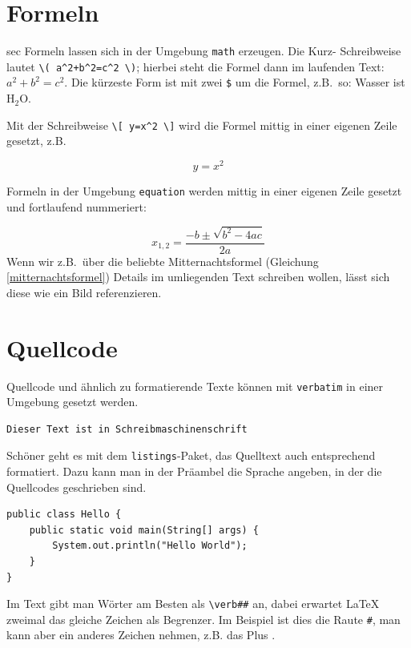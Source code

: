 \section{Formeln}
\label{ch:illustrationen:sec:formula}

sec Formeln lassen sich in der Umgebung  \verb|math| erzeugen.
Die Kurz- Schreibweise lautet \verb|\( a^2+b^2=c^2 \)|;  hierbei steht die Formel dann im laufenden Text: \( a^2+b^2=c^2 \).
Die kürzeste Form ist mit zwei \verb|$| um die Formel, z.B.~so: Wasser ist H$_2$O.

Mit der Schreibweise \verb|\[ y=x^2 \]| wird die Formel mittig in einer eigenen Zeile gesetzt, z.B.

\[y = x^2 \]

Formeln in der Umgebung \verb|equation| werden mittig in einer eigenen Zeile gesetzt und fortlaufend nummeriert:

\begin{equation}
x_{1,2} = \frac{-b\pm\sqrt{b^2-4ac}}{2a}
\label{mitternachtsformel}
\end{equation}
Wenn wir z.B.~über die beliebte Mitternachtsformel (Gleichung \ref{mitternachtsformel}) Details im umliegenden Text schreiben wollen, lässt sich diese wie ein Bild referenzieren.

\section{Quellcode}
\label{ch:illustrationen:sec:code}

Quellcode und ähnlich zu formatierende Texte können mit \verb|verbatim| in einer Umgebung gesetzt werden.

\begin{verbatim}
Dieser Text ist in Schreibmaschinenschrift
\end{verbatim}

Schöner geht es mit dem \verb|listings|-Paket, das Quelltext auch entsprechend formatiert.
Dazu kann man in der Präambel die Sprache angeben, in der die Quellcodes geschrieben sind.

\begin{lstlisting}
public class Hello {
    public static void main(String[] args) {
        System.out.println("Hello World");
    }
}
\end{lstlisting}

Im Text gibt man Wörter am Besten als \verb|\verb##| an, dabei erwartet \LaTeX{} zweimal das gleiche Zeichen als Begrenzer.
Im Beispiel ist dies die Raute \verb|#|, man kann aber ein anderes Zeichen nehmen, z.B. das Plus .

